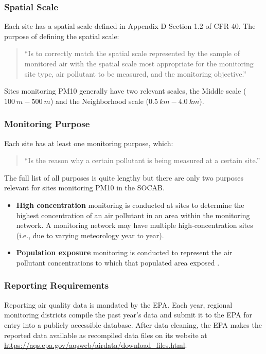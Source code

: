 \documentclass{article}
\begin{document}
\subsubsection*{Spatial Scale}
\label{subsubsec:spatscale}
Each site has a spatial scale defined in Appendix D Section 1.2 of \ac{CFR} 40. The purpose of defining the spatial scale:
\begin{quote}
   ``Is to correctly match the spatial scale represented by the sample of monitored air with the spatial scale most appropriate for the monitoring site type, air pollutant to be measured, and the monitoring objective.''  \cite{CFR:Title40-58}
\end{quote}
Sites monitoring \ac{PM10} generally have two relevant scales, the Middle scale ($100~m - 500~m$) and the Neighborhood scale ($0.5~km - 4.0~km$).  

\subsubsection*{Monitoring Purpose}
\label{subsubsec:purpose}
Each site has at least one monitoring purpose, which: 
\begin{quote}
    ``Is the reason why a certain pollutant is being measured at a certain site.'' \citep{AQMNP:2019} 
\end{quote} The full list of all purposes 
is quite lengthy
but there are only two purposes relevant for sites monitoring \ac{PM10} in the \ac{SOCAB}.  
\begin{itemize}
    \item \textbf{High concentration} monitoring is conducted at sites to determine the highest concentration of an air pollutant in an area within the monitoring network. A monitoring network may have multiple high-concentration sites (i.e., due to varying meteorology year to year).
   \item \textbf{Population exposure} monitoring is conducted to represent the air pollutant concentrations to which that populated area exposed 
   \citep{AQMNP:2019}.
 \end{itemize}


\subsubsection*{Reporting Requirements}
\label{subsubsec:ReportingRequirements}
Reporting air quality data is mandated by the \ac{EPA}.  Each year, regional monitoring districts compile the past year's data and submit it to the \ac{EPA} for entry into a publicly accessible database.  After data cleaning, the \ac{EPA} makes the reported data available as recompiled data files on its website at \url{https://aqs.epa.gov/aqsweb/airdata/download_files.html}.  
\end{document}
